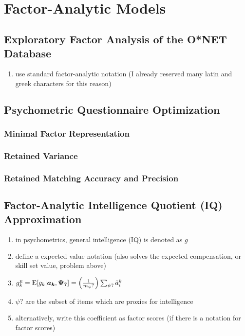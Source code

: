 \documentclass{elsarticle} %
\begin{document}


\section{Factor-Analytic Models}
\subsection{Exploratory Factor Analysis of the O*NET Database}
\begin{enumerate}
    \item use standard factor-analytic notation (I already reserved many latin and greek
          characters for this reason)
\end{enumerate}

\subsection{Psychometric Questionnaire Optimization}
\subsubsection{Minimal Factor Representation}
\subsubsection{Retained Variance}
\subsubsection{Retained Matching Accuracy and Precision}

\subsection{Factor-Analytic Intelligence Quotient (IQ) Approximation}
\begin{enumerate}
    \item in psychometrics, general intelligence (IQ) is denoted as $g$
    \item define a expected value notation (also solves the expected compensation, or
          skill set value, problem above)
    \item $g_{k}^{\text{\tiny{E}}} = \text{E}[g_k | \boldsymbol{a_k}, \boldsymbol{\Psi_?}] = 
    \left(
              \frac{1}{m_\psi?}
              \right)
              \sum_{\psi?}{
                  \tilde{a}_{i}^{k}
              }
          $
    \item $\psi?$ are the subset of items which are proxies for intelligence
    \item alternatively, write this coefficient as factor scores (if there is a notation
          for factor scores)
\end{enumerate}
\end{document}
